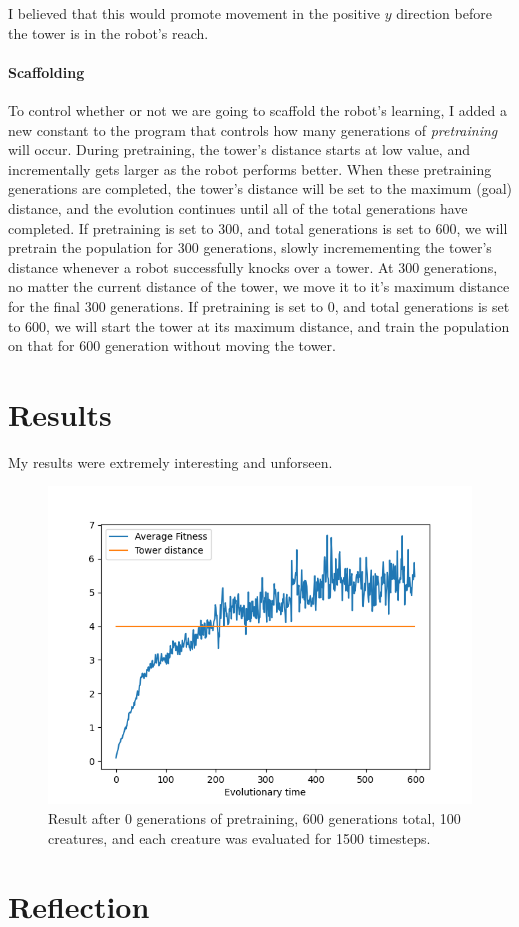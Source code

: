 \documentclass[12pt, a4paper]{article}
\begin{document}
\noindent I believed that this would promote movement in the positive $y$ direction before the tower is in the robot's reach.

\paragraph{Scaffolding} To control whether or not we are going to scaffold the robot's learning, I added a new constant to the program that controls how many generations of \emph{pretraining} will occur. During pretraining, the tower's distance starts at low value, and incrementally gets larger as the robot performs better. When these pretraining generations are completed, the tower's distance will be set to the maximum (goal) distance, and the evolution continues until all of the total generations have completed. If pretraining is set to 300, and total generations is set to 600, we will pretrain the population for 300 generations, slowly incremementing the tower's distance whenever a robot successfully knocks over a tower. At 300 generations, no matter the current distance of the tower, we move it to it's maximum distance for the final 300 generations. If pretraining is set to 0, and total generations is set to 600, we will start the tower at its maximum distance, and train the population on that for 600 generation without moving the tower.
\newpage
\section{Results}
My results were extremely interesting and unforseen.
\begin{figure}[h]
\centering
\includegraphics{0-600-100-1500/0-600-100-1500.png}
\caption{Result after 0 generations of pretraining, 600 generations total, 100 creatures, and each creature was evaluated for 1500 timesteps.}
\end{figure}
\section{Reflection}
\end{document}

